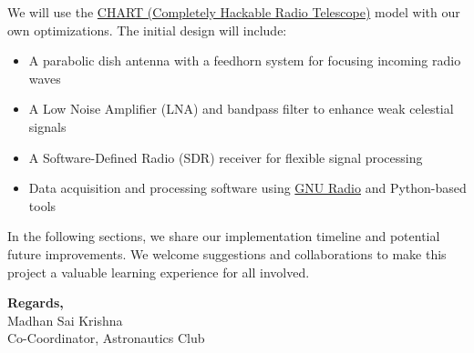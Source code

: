 \documentclass[12pt]{report}
\begin{document}
\begin{titlepage}
\begin{flushleft}
    \medskip

    We will use the \href{https://github.com/astrochart/CHART}{CHART (Completely Hackable Radio Telescope)} model with our own optimizations. The initial design will include:
    \begin{itemize}[leftmargin=1.5em]
        \item A parabolic dish antenna with a feedhorn system for focusing incoming radio waves
        \item A Low Noise Amplifier (LNA) and bandpass filter to enhance weak celestial signals
        \item A Software-Defined Radio (SDR) receiver for flexible signal processing
        \item Data acquisition and processing software using \href{https://github.com/gnuradio}{GNU Radio} and Python-based tools
    \end{itemize}

    In the following sections, we share our implementation timeline and potential future improvements. We welcome suggestions and collaborations to make this project a valuable learning experience for all involved.

    \medskip

    \textbf{Regards,} \\
    Madhan Sai Krishna \\
    Co-Coordinator, Astronautics Club
    \end{flushleft}
\end{titlepage}
    \vspace{2em}
\end{document}
